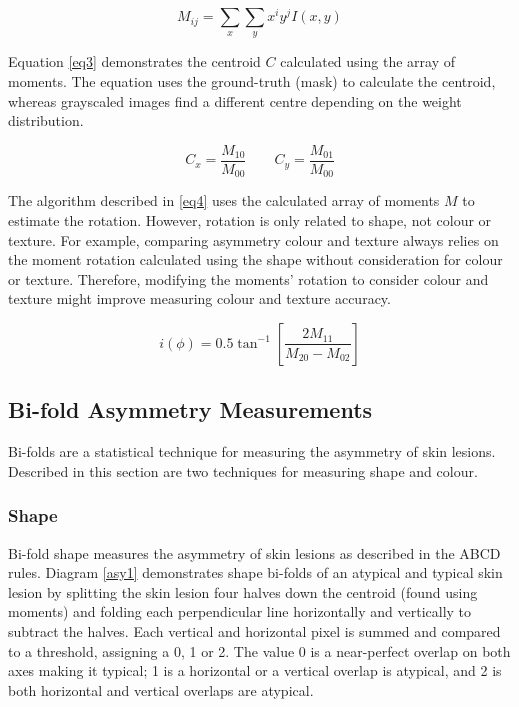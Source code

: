 \documentclass[10.5pt]{report}
\begin{document}
\begin{equation} \label{eq2}
M_{ij}=\sum_x\sum_yx^iy^jI(x,y)
\end{equation}

Equation \ref{eq3} demonstrates the centroid $C$ calculated using the array of moments. The equation uses the ground-truth (mask) to calculate the centroid, whereas grayscaled images find a different centre depending on the weight distribution.

\begin{equation} \label{eq3}
C_x = \frac{M_{10}}{M_{00}}\qquad
C_y = \frac{M_{01}}{M_{00}}
\end{equation}

The algorithm described in \ref{eq4} uses the calculated array of moments $M$ to estimate the rotation. However, rotation is only related to shape, not colour or texture. For example, comparing asymmetry colour and texture always relies on the moment rotation calculated using the shape without consideration for colour or texture. Therefore, modifying the moments' rotation to consider colour and texture might improve measuring colour and texture accuracy.

\begin{equation} \label{eq4}
i(\phi) = 0.5\tan^{-1}[\frac{2M_{11}}{M_{20}-M_{02}}]
\end{equation}

\subsection{Bi-fold Asymmetry Measurements}
Bi-folds are a statistical technique for measuring the asymmetry of skin lesions. Described in this section are two techniques for measuring shape and colour.

\subsubsection{Shape}
Bi-fold shape measures the asymmetry of skin lesions as described in the ABCD rules. Diagram \ref{asy1} demonstrates shape bi-folds of an atypical and typical skin lesion by splitting the skin lesion four halves down the centroid (found using moments) and folding each perpendicular line horizontally and vertically to subtract the halves. Each vertical and horizontal pixel is summed and compared to a threshold, assigning a 0, 1 or 2. The value 0 is a near-perfect overlap on both axes making it typical; 1 is a horizontal or a vertical overlap is atypical, and 2 is both horizontal and vertical overlaps are atypical.
\end{document}
